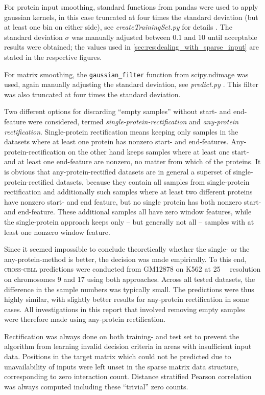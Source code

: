 For protein input smoothing, standard functions from pandas \cite{McKinney2010} were used to apply
gaussian kernels, in this case truncated at four times the standard deviation (but at least one bin on either side),
see \emph{createTrainingSet.py} for details \cite{Krauth2020}. 
The standard deviation $\sigma$ was manually adjusted between 0.1 and 10 until acceptable results were obtained;
the values used in \autoref{sec:res:dealing_with_sparse_input} are stated in the respective figures.

For matrix smoothing, the \texttt{gaussian\_filter} function from scipy.ndimage \cite{Virtanen2020, SciPyNdimage2019} was used,
again manually adjusting the standard deviation, see \emph{predict.py} \cite{Krauth2020}.  
This filter was also truncated at four times the standard deviation.

Two different options for discarding ``empty samples'' without start- and end-feature were considered, 
termed \emph{single-protein-rectification} and \emph{any-protein rectification}.
Single-protein rectification means keeping only samples in the datasets where at least one protein has nonzero start- and end-features. 
Any-protein-rectification on the other hand keeps samples where at least one start- and at least one end-feature are nonzero, 
no matter from which of the proteins.
It is obvious that any-protein-rectified datasets are in general a superset of single-protein-rectified datasets, 
because they contain all samples from single-protein rectification and additionally such samples where at least two
different proteins have nonzero start- and end feature, but no single protein has both nonzero start- and end-feature.
These additional samples all have zero window features, 
while the single-protein approach keeps only -- but generally not all -- samples with at least one nonzero window feature.

Since it seemed impossible to conclude theoretically whether the single- or the any-protein-method is better, 
the decision was made empirically.
To this end, \textsc{cross-cell} predictions were conducted from GM12878 on K562 at \SI{25}{\kilo\bp} resolution 
on chromosomes 9 and 17 using both approaches.
Across all tested datasets, the difference in the sample numbers was typically small.
The predictions were thus highly similar, with slightly better results for any-protein rectification in some cases.
All investigations in this report that involved removing empty samples were therefore made using any-protein rectification.

Rectification was always done on both training- and test set 
to prevent the algorithm from learning invalid decision criteria
in areas with insufficient input data.
Positions in the target matrix which could not be predicted due to unavailability of inputs
were left unset in the sparse matrix data structure, corresponding to zero interaction count.
Distance stratified Pearson correlation was always computed including these ``trivial'' zero counts.

